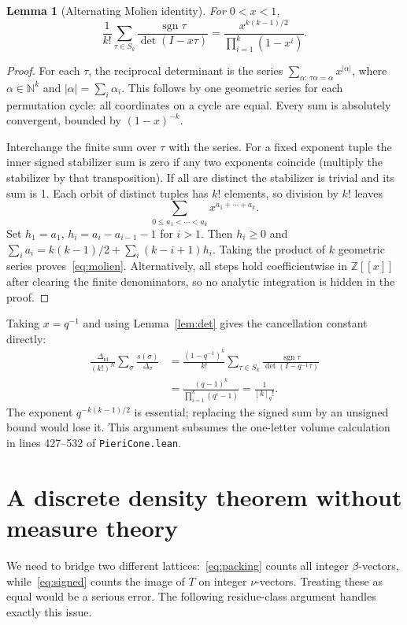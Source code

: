 \documentclass[11pt]{article}
\newtheorem{lemma}[theorem]{Lemma}
\theoremstyle{remark}\newtheorem{remark}[theorem]{Remark}
\newcommand{\Z}{\mathbb Z}\newcommand{\N}{\mathbb N}\newcommand{\R}{\mathbb R}
\newcommand{\sgn}{\operatorname{sgn}}\newcommand{\im}{\operatorname{im}}\newcommand{\rank}{\operatorname{rank}}
\newcommand{\code}[1]{\texttt{#1}}
\begin{document}
\begin{lemma}[Alternating Molien identity]\label{lem:molien}
For $0<x<1$,
\begin{equation}\label{eq:molien}
 \frac1{k!}\sum_{\tau\in S_k}\frac{\sgn\tau}{\det(I-x\tau)}
 =\frac{x^{k(k-1)/2}}{\prod_{i=1}^k(1-x^i)}.
\end{equation}
\end{lemma}
\begin{proof}
For each $\tau$, the reciprocal determinant is the series $\sum_{\alpha:\,\tau\alpha=\alpha}x^{|\alpha|}$, where $\alpha\in\N^k$ and $|\alpha|=\sum_i\alpha_i$. This follows by one geometric series for each permutation cycle: all coordinates on a cycle are equal. Every sum is absolutely convergent, bounded by $(1-x)^{-k}$.

Interchange the finite sum over $\tau$ with the series. For a fixed exponent tuple the inner signed stabilizer sum is zero if any two exponents coincide (multiply the stabilizer by that transposition). If all are distinct the stabilizer is trivial and its sum is 1. Each orbit of distinct tuples has $k!$ elements, so division by $k!$ leaves
\[
 \sum_{0\leq a_1<\cdots<a_k}x^{a_1+\cdots+a_k}.
\]
Set $h_1=a_1$, $h_i=a_i-a_{i-1}-1$ for $i>1$. Then $h_i\geq0$ and $\sum_i a_i=k(k-1)/2+\sum_i(k-i+1)h_i$. Taking the product of $k$ geometric series proves~\eqref{eq:molien}. Alternatively, all steps hold coefficientwise in $\Z[[x]]$ after clearing the finite denominators, so no analytic integration is hidden in the proof.
\end{proof}

Taking $x=q^{-1}$ and using Lemma~\ref{lem:det} gives the cancellation constant directly:
\begin{align}
 \frac{\Delta_{\mathrm{id}}}{(k!)^N}
 \sum_\sigma \frac{s(\sigma)}{\Delta_\sigma}
 &=\frac{(1-q^{-1})^k}{k!}
 \sum_{\tau\in S_k}\frac{\sgn\tau}{\det(I-q^{-1}\tau)}\\
 &=\frac{(q-1)^k}{\prod_{i=1}^k(q^i-1)}=\frac1{[k]_q!}.
 \label{eq:flagfactor}
\end{align}
The exponent $q^{-k(k-1)/2}$ is essential; replacing the signed sum by an unsigned bound would lose it. This argument subsumes the one-letter volume calculation in lines 427--532 of \code{PieriCone.lean}.

\section{A discrete density theorem without measure theory}\label{sec:density}
We need to bridge two different lattices:~\eqref{eq:packing} counts all integer $\beta$-vectors, while~\eqref{eq:signed} counts the image of $T$ on integer $\nu$-vectors. Treating these as equal would be a serious error. The following residue-class argument handles exactly this issue.
\end{document}
